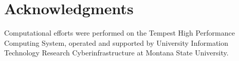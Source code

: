\documentclass[11pt]{article}
\begin{document}
\section{Acknowledgments}

Computational efforts were performed on the Tempest High Performance Computing System, operated and supported by University Information Technology Research Cyberinfrastructure at Montana State University.


\clearpage

\printbibliography[
heading=bibintoc,
title={References}
]
\end{document}
